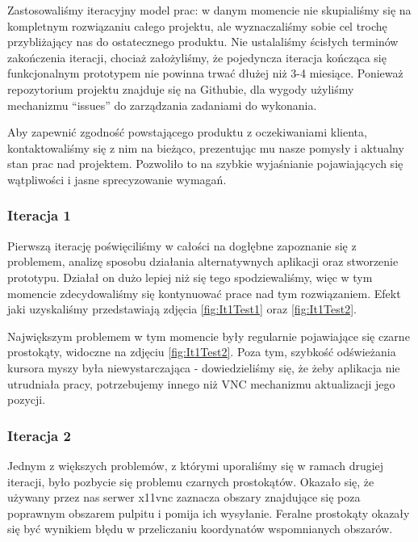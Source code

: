     Zastosowaliśmy iteracyjny model prac: w danym momencie nie skupialiśmy się na kompletnym rozwiązaniu całego projektu, ale wyznaczaliśmy sobie cel trochę przybliżający nas do ostatecznego produktu. Nie ustalaliśmy ścisłych terminów zakończenia iteracji, chociaż założyliśmy, że pojedyncza iteracja kończąca się funkcjonalnym prototypem nie powinna trwać dłużej niż 3-4 miesiące. Ponieważ repozytorium projektu znajduje się na Githubie, dla wygody użyliśmy mechanizmu ``issues'' do zarządzania zadaniami do wykonania.

    Aby zapewnić zgodność powstającego produktu z oczekiwaniami klienta, kontaktowaliśmy się z nim na bieżąco, prezentując mu nasze pomysły i aktualny stan prac nad projektem. Pozwoliło to na szybkie wyjaśnianie pojawiających się wątpliwości i jasne sprecyzowanie wymagań.

    \subsubsection{Iteracja 1}

      Pierwszą iterację poświęciliśmy w całości na dogłębne zapoznanie się z problemem, analizę sposobu działania alternatywnych aplikacji oraz stworzenie prototypu. Działał on dużo lepiej niż się tego spodziewaliśmy, więc w tym momencie zdecydowaliśmy się kontynuować prace nad tym rozwiązaniem. Efekt jaki uzyskaliśmy przedstawiają zdjęcia \ref{fig:It1Test1} oraz \ref{fig:It1Test2}.

      Największym problemem w tym momencie były regularnie pojawiające się czarne prostokąty, widoczne na zdjęciu \ref{fig:It1Test2}. Poza tym, szybkość odświeżania kursora myszy była niewystarczająca - dowiedzieliśmy się, że żeby aplikacja nie utrudniała pracy, potrzebujemy innego niż VNC mechanizmu aktualizacji jego pozycji.


    \subsubsection{Iteracja 2}

      \label{sec:x11vncBug}
      Jednym z większych problemów, z którymi uporaliśmy się w ramach drugiej iteracji, było pozbycie się problemu czarnych prostokątów. Okazało się, że używany przez nas serwer x11vnc zaznacza obszary znajdujące się poza poprawnym obszarem pulpitu i pomija ich wysyłanie. Feralne prostokąty okazały się być wynikiem błędu w przeliczaniu koordynatów wspomnianych obszarów.


